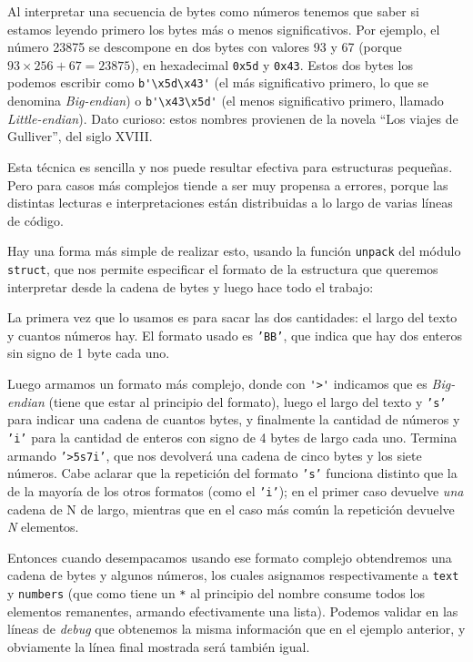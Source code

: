 \begin{info}
Al interpretar una secuencia de bytes como números tenemos que saber si estamos leyendo primero los bytes más o menos significativos. Por ejemplo, el número 23875 se descompone en dos bytes con valores 93 y 67 (porque $93 \times 256 + 67 = 23875$), en hexadecimal \texttt{0x5d} y \texttt{0x43}. Estos dos bytes los podemos escribir como \verb|b'\x5d\x43'| (el más significativo primero, lo que se denomina \textit{Big-endian}) o \verb|b'\x43\x5d'| (el menos significativo primero, llamado \textit{Little-endian}). Dato curioso: estos nombres provienen de la novela ``Los viajes de Gulliver'', del siglo XVIII.
\end{info}

Esta técnica es sencilla y nos puede resultar efectiva para estructuras pequeñas. Pero para casos más complejos tiende a ser muy propensa a errores, porque las distintas lecturas e interpretaciones están distribuidas a lo largo de varias líneas de código.

Hay una forma más simple de realizar esto, usando la función \texttt{unpack} del módulo \texttt{struct}, que nos permite especificar el formato de la estructura que queremos interpretar desde la cadena de bytes y luego hace todo el trabajo:


La primera vez que lo usamos es para sacar las dos cantidades: el largo del texto y cuantos números hay. El formato usado es \texttt{'BB'}, que indica que hay dos enteros sin signo de 1 byte cada uno.

Luego armamos un formato más complejo, donde con \verb|'>'| indicamos que es \textit{Big-endian} (tiene que estar al principio del formato), luego el largo del texto y \texttt{'s'} para indicar una cadena de cuantos bytes, y finalmente la cantidad de números y \texttt{'i'} para la cantidad de enteros con signo de 4 bytes de largo cada uno. Termina armando \texttt{'>5s7i'}, que nos devolverá una cadena de cinco bytes y los siete números. Cabe aclarar que la repetición del formato \texttt{'s'} funciona distinto que la de la mayoría de los otros formatos (como el \texttt{'i'}); en el primer caso devuelve \textit{una} cadena de N de largo, mientras que en el caso más común la repetición devuelve \textit{N} elementos.

Entonces cuando desempacamos usando ese formato complejo obtendremos una cadena de bytes y algunos números, los cuales asignamos respectivamente a \texttt{text} y \texttt{numbers} (que como tiene un \texttt{*} al principio del nombre consume todos los elementos remanentes, armando efectivamente una lista). Podemos validar en las líneas de \textit{debug} que obtenemos la misma información que en el ejemplo anterior, y obviamente la línea final mostrada será también igual.

